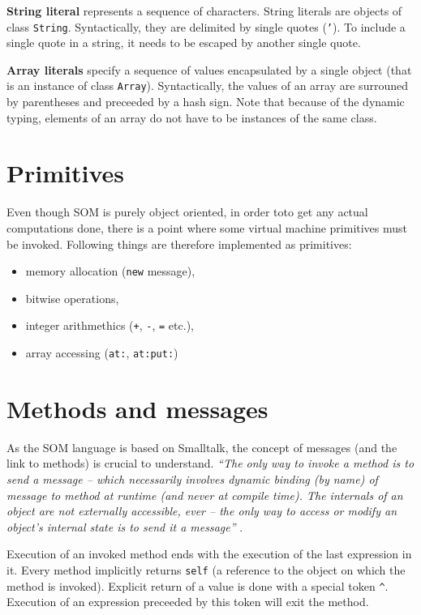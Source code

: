 \documentclass[thesis=M,english]{FITthesis}[2019/12/23]
\begin{document}
\textbf{String literal} represents a sequence of characters. String literals are objects of class \texttt{String}.
Syntactically, they are delimited by single quotes (\texttt{'}). To include a single quote in a string, it needs
to be escaped by another single quote.

\textbf{Array literals} specify a sequence of values encapsulated by a single object (that is an instance of class
\texttt{Array}). Syntactically, the values of an array are surrouned by parentheses and preceeded by a hash sign.
Note that because of the dynamic typing, elements of an array do not have to be instances of the same class.

\section{Primitives}
Even though SOM is purely object oriented, in order toto get any actual computations done, there is a point where
some virtual machine primitives must be invoked. Following things are therefore implemented as primitives:
\begin{itemize}
	\item memory allocation (\texttt{new} message),
	\item bitwise operations,
	\item integer arithmethics (\texttt{+}, \texttt{-}, \texttt{=} etc.),
	\item array accessing (\texttt{at:}, \texttt{at:put:})
\end{itemize}

\section{Methods and messages}
As the SOM language is based on Smalltalk, the concept of messages (and the link to methods) is crucial to understand.
\textit{``The only way to invoke a method is to send a message -- which necessarily involves dynamic binding
(by name) of message to method at runtime (and never at compile time). The internals of an object are not
externally accessible, ever -- the only way to access or modify an object's internal state is to send it
a message''} \cite{smalltalk-essentials}.

Execution of an invoked method ends with the execution of the last expression in it. Every method implicitly
returns \texttt{self} (a reference to the object on which the method is invoked). Explicit return of a value
is done with a special token \texttt{\^}. Execution of an expression preceeded by this token will exit the method.
\end{document}
